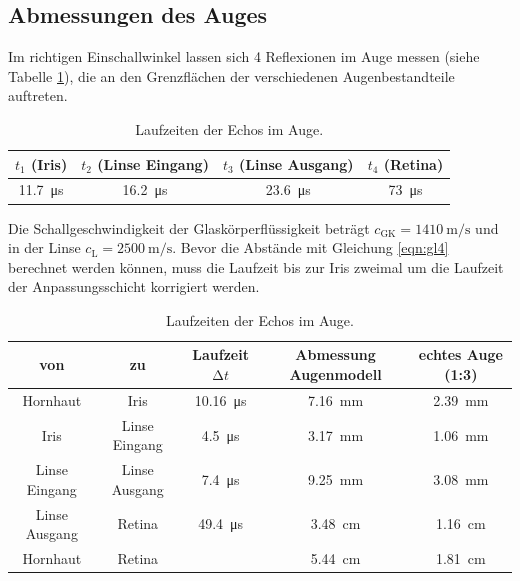 \FloatBarrier

\subsection{Abmessungen des Auges}

Im richtigen Einschallwinkel lassen sich 4 Reflexionen im Auge messen (siehe Tabelle \ref{tab:Auge1}), die an den Grenzflächen der verschiedenen Augenbestandteile auftreten.
\begin{table}
  \centering
  \caption{Laufzeiten der Echos im Auge.}
  \label{tab:Auge1}
  \begin{tabular}{c c c c}
    \toprule
    $t_1$ (Iris) & $t_2$ (Linse Eingang) & $t_3$ (Linse Ausgang) & $t_4$ (Retina) \\
    \midrule
    \SI{11.7}{\micro\second} & \SI{16.2}{\micro\second} & \SI{23.6}{\micro\second} & \SI{73}{\micro\second} \\
    \bottomrule
  \end{tabular}
\end{table}
Die Schallgeschwindigkeit der Glaskörperflüssigkeit beträgt $c_\text{GK} = \SI{1410}{\meter\per\second}$ und in der Linse $c_\text{L} = \SI{2500}{\meter\per\second}$.
Bevor die Abstände mit Gleichung \eqref{eqn:gl4} berechnet werden können, muss die Laufzeit bis zur Iris zweimal um die Laufzeit der Anpassungsschicht korrigiert werden.
\begin{table}
  \centering
  \caption{Laufzeiten der Echos im Auge.}
  \label{tab:Auge2}
  \begin{tabular}{c c c c c}
    \toprule
    von & zu & Laufzeit $\increment t$ & Abmessung Augenmodell & echtes Auge (1:3) \\
    \midrule
    Hornhaut & Iris & \SI{10.16}{\micro\second} & \SI{7.16}{\milli\meter} & \SI{2.39}{\milli\meter}  \\
    Iris & Linse Eingang & \SI{4.5}{\micro\second} & \SI{3.17}{\milli\meter} & \SI{1.06}{\milli\meter} \\
    Linse Eingang & Linse Ausgang & \SI{7.4}{\micro\second} & \SI{9.25}{\milli\meter} & \SI{3.08}{\milli\meter} \\
    Linse Ausgang & Retina & \SI{49.4}{\micro\second} & \SI{3.48}{\centi\meter} & \SI{1.16}{\centi\meter} \\
    Hornhaut & Retina & & \SI{5.44}{\centi\meter} & \SI{1.81}{\centi\meter} \\
    \bottomrule
  \end{tabular}
\end{table}
